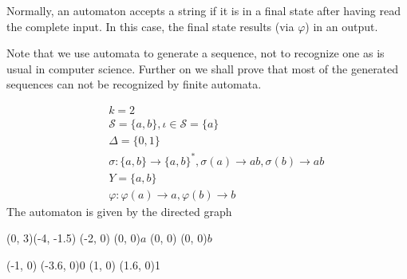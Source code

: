 \documentclass{article}
\begin{document}
\begin{remark} \label{rem:output}
Normally, an automaton accepts a string if it is in
a final state after having read the complete input. In this case, the final 
state results (via $\varphi$) in an output.
\end{remark}

\begin{remark} \label{rem:generate_accept}
Note that we use automata to generate a sequence, not to recognize one as is
usual in computer science. Further on we shall prove that most of the generated
sequences can not be recognized by finite automata.
\end{remark}

\begin{example} \label{ex:ab_star}
\begin{eqnarray*}
&&k = 2\\
&&\mathcal{S} = \{a, b\}, \iota \in \mathcal{S} = \{a\}\\
&&\Delta = \{0, 1\}\\
&&\sigma:\{a, b\} \to \{a, b\}^*, \sigma(a) \to ab,
\sigma(b) \to ab\\
&&Y = \{a, b\}\\
&&\varphi: \varphi(a) \to a, \varphi(b) \to b
\end{eqnarray*}
The automaton is given by the directed graph

\begin{graph}(0, 3)(-4, -1.5)
  (-2, 0) (0, 0){$a$}
  (0, 0)  (0, 0){$b$}

  (-1, 0) \freetext(-3.6, 0){0}
   
   
  (1, 0) \freetext(1.6, 0){1}


\end{graph}
\end{example}
\end{document}
